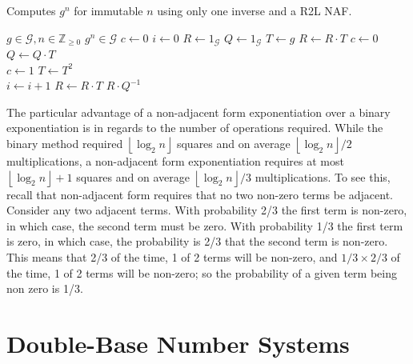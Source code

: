 \documentclass{ucalgthes1}
\theoremstyle{plain}
\theoremstyle{definition}
\newcommand{\ZZgez}{\mathbb{Z}_{\ge 0}}
\newcommand{\floor}[1]{\left\lfloor #1 \right\rfloor}
\begin{document}
\begin{algorithm}[h]
\caption{Computes $g^n$ for immutable $n$ using only one inverse and a R2L NAF.}\label{alg:nafR2LImmutable}
\begin{algorithmic}[1]
\REQUIRE $g \in \mathcal G, n \in \ZZgez$
\ENSURE $g^n \in \mathcal G$
\STATE $c \gets 0$ 
\STATE $i \gets 0$
\STATE $R \gets 1_{\mathcal G}$ 
\STATE $Q \gets 1_{\mathcal G}$ 
\STATE $T \gets g$ 
	\IF {$\floor{n/2^i}+c \equiv 1 \pmod 4$}
		\STATE $R \gets R \cdot T$
		\STATE $c \gets 0$
	\ELSIF {$\floor{n/2^i}+c \equiv 3 \pmod 4$}
		\STATE $Q \gets Q \cdot T$ \\
		\STATE $c \gets 1$
	\ENDIF
	\STATE $T \gets T^2$ \\
	\STATE $i \gets i+1$
\ENDWHILE
{} \STATE $R \gets R \cdot T$ \ENDIF
\RETURN $R \cdot Q^{-1}$
\end{algorithmic}
\end{algorithm}

The particular advantage of a non-adjacent form exponentiation over a binary exponentiation is in regards to the number of operations required.  While the binary method required $\floor{\log_2 n}$ squares and on average $\floor{\log_2 n}/2$ multiplications, a non-adjacent form exponentiation requires at most $\floor{\log_2 n}+1$ squares and on average $\floor{\log_2 n}/3$ multiplications.  To see this, recall that non-adjacent form requires that no two non-zero terms be adjacent.  Consider any two adjacent terms.  With probability 2/3 the first term is non-zero, in which case, the second term must be zero.  With probability 1/3 the first term is zero, in which case, the probability is 2/3 that the second term is non-zero.  This means that 2/3 of the time, 1 of 2 terms will be non-zero, and $1/3 \times 2/3$ of the time, 1 of 2 terms will be non-zero; so the probability of a given term being non zero is 1/3.


\bigbreak
\section{Double-Base Number Systems}\label{section:dbns}
\end{document}
